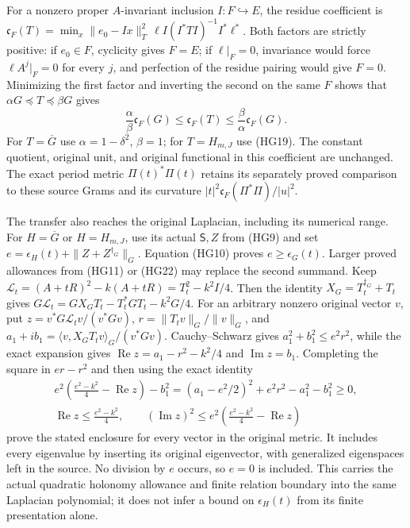 For a nonzero proper $A$-invariant inclusion $I:F\hookrightarrow E$,
the residue coefficient is
$\mathfrak c_F(T)=\min_x\|e_0-Ix\|_T^2\,
\ell I(I^*TI)^{-1}I^*\ell^*$.
Both factors are strictly positive: if $e_0\in F$, cyclicity gives
$F=E$; if $\ell|_F=0$, invariance would force
$\ell A^j|_F=0$ for every $j$, and perfection of the residue pairing
would give $F=0$. Minimizing the first factor and inverting the second
on the same $F$ shows that $\alpha G\preceq T\preceq\beta G$ gives
\[
 \frac{\alpha}{\beta}\mathfrak c_F(G)
 \le\mathfrak c_F(T)\le
 \frac{\beta}{\alpha}\mathfrak c_F(G).
 \tag{HG24}
\]
For $T=\overline G$ use $\alpha=1-\delta^2$, $\beta=1$;
for $T=H_{m,J}$ use (HG19). The constant quotient, original unit,
and original functional in this coefficient are unchanged.
The exact period metric $\Pi(t)^*\Pi(t)$ retains its separately
proved comparison to these source Grams and its curvature
$|t|^2\mathfrak c_F(\Pi^*\Pi)/|u|^2$.

The transfer also reaches the original Laplacian, including its
numerical range. For $H=\overline G$ or $H=H_{m,J}$, use its actual
$\mathsf S,Z$ from (HG9) and set
$e=\epsilon_H(t)+\|Z+Z^{\dagger_G}\|_G$.
Equation (HG10) proves $e\ge\epsilon_G(t)$. Larger proved allowances
from (HG11) or (HG22) may replace the second summand. Keep
$\mathcal L_t=(A+tR)^2-k(A+tR)=T_t^2-k^2I/4$.
Then the identity $X_G=T_t^{\dagger_G}+T_t$ gives
$G\mathcal L_t=GX_GT_t-T_t^*GT_t-k^2G/4$.
For an arbitrary nonzero original vector $v$, put
$z=v^*G\mathcal L_tv/(v^*Gv)$,
$r=\|T_tv\|_G/\|v\|_G$, and
$a_1+ib_1=\langle v,X_GT_tv\rangle_G/(v^*Gv)$.
Cauchy--Schwarz gives $a_1^2+b_1^2\le e^2r^2$, while the exact
expansion gives $\operatorname{Re}z=a_1-r^2-k^2/4$ and
$\operatorname{Im}z=b_1$. Completing the square in $er-r^2$
and then using the exact identity
\[
\begin{gathered}
 e^2\left(\frac{e^2-k^2}{4}-\operatorname{Re}z\right)-b_1^2
 =(a_1-e^2/2)^2+e^2r^2-a_1^2-b_1^2\ge0,\\
 \operatorname{Re}z\le\frac{e^2-k^2}{4},\qquad
 (\operatorname{Im}z)^2\le
 e^2\left(\frac{e^2-k^2}{4}-\operatorname{Re}z\right)
\end{gathered}\tag{HG25}
\]
prove the stated enclosure for every vector in the original metric.
It includes every eigenvalue by inserting its original eigenvector,
with generalized eigenspaces left in the source. No division by $e$
occurs, so $e=0$ is included. This carries the actual quadratic
holonomy allowance and finite relation boundary into the same
Laplacian polynomial; it does not infer a bound on $\epsilon_H(t)$
from its finite presentation alone.

